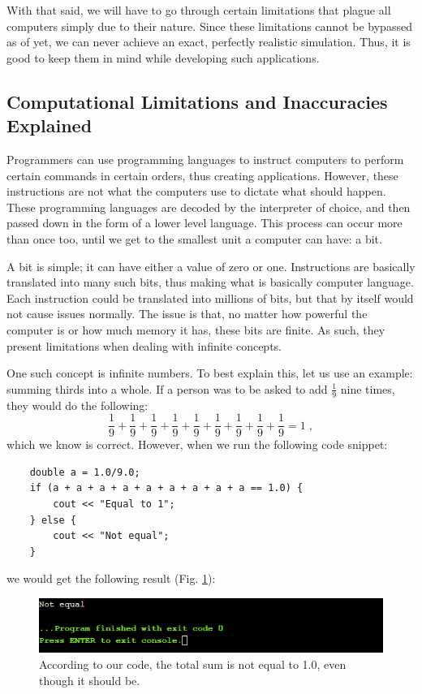 With that said, we will have to go through certain limitations that plague all computers simply due to their nature. Since these limitations cannot be bypassed as of yet, we can never achieve an exact, perfectly realistic simulation. Thus, it is good to keep them in mind while developing such applications.

\subsection{Computational Limitations and Inaccuracies Explained}

Programmers can use programming languages to instruct computers to perform certain commands in certain orders, thus creating applications. However, these instructions are not what the computers use to dictate what should happen. These programming languages are decoded by the interpreter of choice, and then passed down in the form of a lower level language. This process can occur more than once too, until we get to the smallest unit a computer can have: a bit.

A bit is simple; it can have either a value of zero or one. Instructions are basically translated into many such bits, thus making what is basically computer language. Each instruction could be translated into millions of bits, but that by itself would not cause issues normally. The issue is that, no matter how powerful the computer is or how much memory it has, these bits are finite. As such, they present limitations when dealing with infinite concepts.

One such concept is infinite numbers. To best explain this, let us use an example: summing thirds into a whole. If a person was to be asked to add $\frac{1}{9}$ nine times, they would do the following:
$$\frac{1}{9} + \frac{1}{9} + \frac{1}{9} + \frac{1}{9} + \frac{1}{9} + \frac{1}{9} + \frac{1}{9} + \frac{1}{9} + \frac{1}{9} = 1 \;,$$ which we know is correct. However, when we run the following code snippet:

\begin{verbatim}
	double a = 1.0/9.0;
	if (a + a + a + a + a + a + a + a + a == 1.0) {
		cout << "Equal to 1";
	} else {
		cout << "Not equal";
	}
\end{verbatim}

we would get the following result (Fig. \ref{fig:finiteprecision}): 
\begin{figure}[h!]
	\centering
	\includegraphics{Figures/finiteprecision}
	\decoRule
	\caption[Code Result]{According to our code, the total sum is not equal to 1.0, even though it should be.}
	\label{fig:finiteprecision}
\end{figure}

